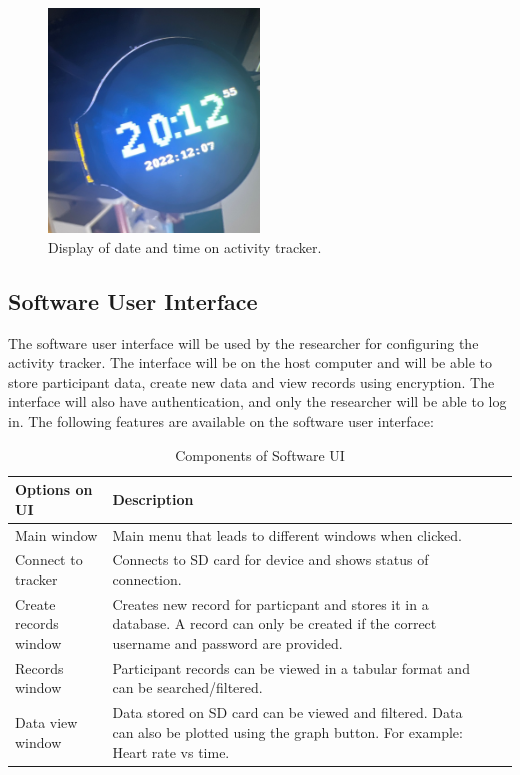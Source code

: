 \documentclass[12pt, titlepage]{article}
\begin{document}
\begin{figure}[H]
	\begin{center}
		 \includegraphics[width=0.5\textwidth]{DisplayTime}
		\caption{Display of date and time on activity tracker.}
		\label{DisplayTime} 
	\end{center}
\end{figure}
\newpage

\subsection{Software User Interface}

The software user interface will be used by the researcher for configuring the activity tracker. The interface will be on the host computer and will be able to store participant data, create new data and view records using encryption. The interface will also have authentication, and only the researcher will be able to log in. The following features are available on the software user interface:

\begin{table}[H]
	\begin{tabularx}{1.05\textwidth} { 
		  | >{\centering\arraybackslash}X 
		  | >{\centering\arraybackslash}X 
		  | >{\centering\arraybackslash}X 
		  | >{\centering\arraybackslash}X | }
		 \hline
		 \textbf{Options on UI} & \textbf{Description}\\
		 \hline
		Main window & Main menu that leads to different windows when clicked.\\
		\hline
		 Connect to tracker  & Connects to SD card for device and shows status of connection.\\
		 \hline
		   Create records window & Creates new record for particpant and stores it in a database. A record can only be created if the correct username and password are provided. \\
		\hline 
		Records window & Participant records can be viewed in a tabular format and can be searched/filtered.\\
		\hline
		Data view window & Data stored on SD card can be viewed and filtered. Data can also be plotted using the graph button. For example: Heart rate vs time.\\
		\hline
	\end{tabularx}
\caption{\label{Software User Interface}Components of Software UI}  
\end{table}
\end{document}
